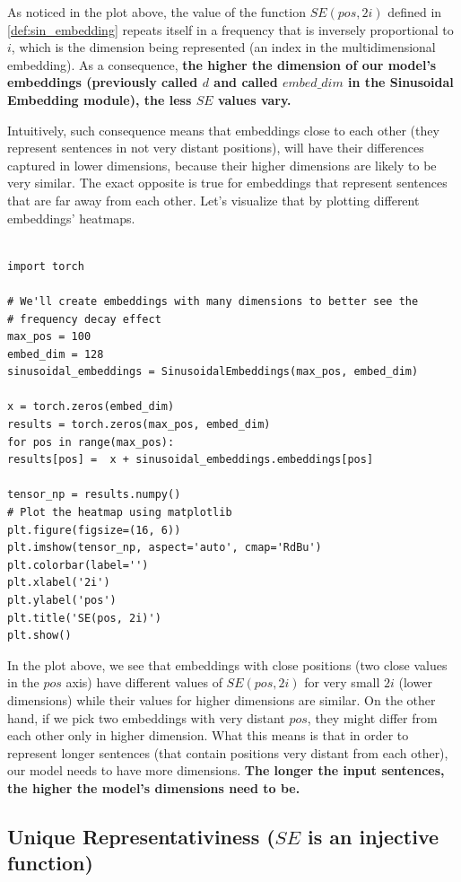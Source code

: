\documentclass{article}
\begin{document}
As noticed in the plot above, the value of the function $SE(pos, 2i)$ defined in \ref{def:sin_embedding} repeats itself in a frequency that is inversely proportional to $i$, which is the dimension being represented (an index in the multidimensional embedding). As a consequence, \textbf{the higher the dimension of our model's embeddings (previously called $d$ and called $embed\_dim$ in the Sinusoidal Embedding module), the less $SE$ values vary.} 

Intuitively, such consequence means that embeddings close to each other (they represent sentences in not very distant positions), will have their differences captured in lower dimensions, because their higher dimensions are likely to be very similar. The exact opposite is true for embeddings that represent sentences that are far away from each other. Let's visualize that by plotting different embeddings' heatmaps.


\begin{lstlisting}[caption={Generating the plot of the sinusoidal embeddings for different positions}]
	
import torch

# We'll create embeddings with many dimensions to better see the 
# frequency decay effect
max_pos = 100
embed_dim = 128
sinusoidal_embeddings = SinusoidalEmbeddings(max_pos, embed_dim)

x = torch.zeros(embed_dim)
results = torch.zeros(max_pos, embed_dim)
for pos in range(max_pos):
results[pos] =  x + sinusoidal_embeddings.embeddings[pos]

tensor_np = results.numpy()
# Plot the heatmap using matplotlib
plt.figure(figsize=(16, 6))
plt.imshow(tensor_np, aspect='auto', cmap='RdBu')
plt.colorbar(label='')
plt.xlabel('2i')
plt.ylabel('pos')
plt.title('SE(pos, 2i)')
plt.show()
\end{lstlisting}


In the plot above, we see that embeddings with close positions (two close values in the $pos$ axis) have different values of $SE(pos, 2i)$ for very small $2i$ (lower dimensions) while their values for higher dimensions are similar. On the other hand, if we pick two embeddings with very distant $pos$, they might differ from each other only in higher dimension. What this means is that in order to represent longer sentences (that contain positions very distant from each other), our model needs to have more dimensions. \textbf{The longer the input sentences, the higher the model's dimensions need to be.}

\subsection{Unique Representativiness ($SE$ is an injective function)}
\end{document}
